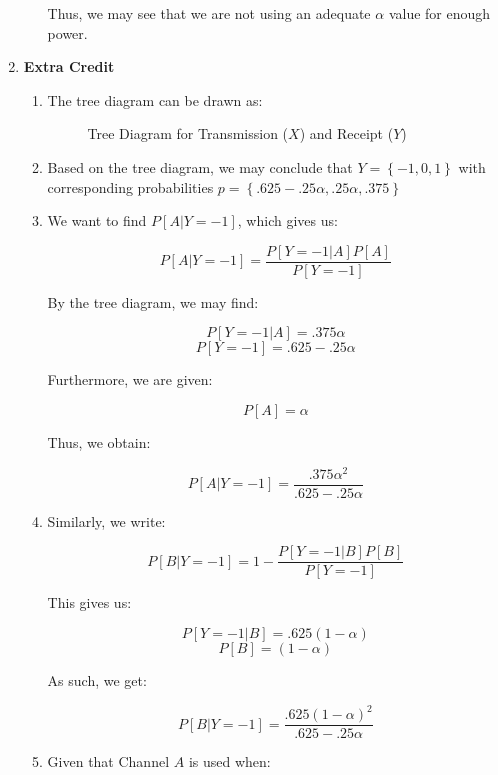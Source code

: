 \begin{enumerate}
\begin{enumerate}
        Thus, we may see that we are not using an adequate $\alpha$ value for enough power.

    \end{enumerate}

    \setcounter{enumi}{4}

  \item \textbf{Extra Credit}

    \begin{enumerate}

      \item The tree diagram can be drawn as:

        \begin{figure}[H]
          \centering
          
          \caption{Tree Diagram for Transmission ($X$) and Receipt ($Y$)}
          \label{fig:1}
        \end{figure}

      \item Based on the tree diagram, we may conclude that $\boxed{Y=\left\{ -1,0,1\right\}}$ with corresponding probabilities $\boxed{p=\left\{ .625-.25\alpha, .25\alpha, .375\right\}}$

      \item We want to find $P[A|Y=-1]$, which gives us:

        $$P[A|Y=-1]=\frac{P[Y=-1|A]P[A]}{P[Y=-1]}$$

        By the tree diagram, we may find:

        $$P[Y=-1|A]=.375\alpha$$
        $$P[Y=-1]=.625-.25\alpha$$

        Furthermore, we are given:

        $$P[A]=\alpha$$

        Thus, we obtain:

        $$\boxed{P[A|Y=-1]=\frac{.375\alpha^2}{.625-.25\alpha}}$$

      \item Similarly, we write:

        $$P[B|Y=-1]=1-\frac{P[Y=-1|B]P[B]}{P[Y=-1]}$$

        This gives us:

        $$P[Y=-1|B]=.625(1-\alpha)$$
        $$P[B]=(1-\alpha)$$

        As such, we get:

        $$\boxed{P[B|Y=-1]=\frac{.625(1-\alpha)^2}{.625-.25\alpha}}$$

      \item Given that Channel $A$ is used when:


\end{enumerate}
\end{enumerate}
